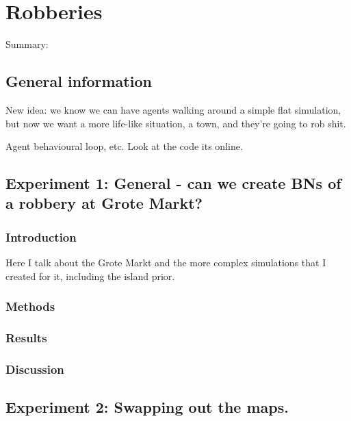  

\chapter[Robberies in real locations]{Robberies}


Summary:

\section{General information}
New idea: we know we can have agents walking around a simple flat simulation, but now we want a more life-like situation, a town, and they're going to rob shit.

Agent behavioural loop, etc. Look at the code its online.




\section{Experiment 1: General - can we create BNs of a robbery at Grote Markt?}
\subsection{Introduction}
Here I talk about the Grote Markt and the more complex simulations that I created for it, including the island prior.

\subsection{Methods}

\subsection{Results}

\subsection{Discussion}

\section{Experiment 2: Swapping out the maps.}

